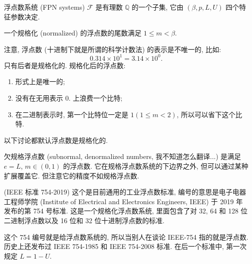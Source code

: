 \documentclass[a4paper]{ctexart}
\begin{document}
 浮点数系统 (FPN systems) $\mathscr{F}$ 是有理数
$\mathbb{Q}$ 的一个子集, 它由 $(\beta, p, L, U)$ 四个特征参数决定.

 一个规格化 (normalized) 的浮点数的尾数满足
$1 \leq m < \beta$.

注意, 浮点数 (十进制下就是所谓的科学计数法) 的表示是不唯一的, 比如:
$$
0.314 \times 10^1 = 3.14 \times 10^0.
$$
只有后者是规格化的. 规格化后的浮点数:
\begin{enumerate}
\item 形式上是唯一的;
\item 没有在无用表示 $0.$ 上浪费一个比特;
\item 在二进制表示时, 第一个比特位一定是 $1(1 \leq m < 2)$,
  所以可以省下这个比特.
\end{enumerate}
以下讨论都默认浮点数是规格化的.

 欠规格浮点数 (subnormal, denormalized numbers,
我不知道怎么翻译...) 是满足 $e = L$, $m \in (0, 1)$ 的浮点数.
它在规格浮点数系统的下边界之外, 但可以通过某种扩展覆盖它.
但注意它的精度不如规格浮点数.

 (IEEE 标准 754-2019) 这个是目前通用的工业浮点数标准,
编号的意思是电子电器工程师学院
(Institute of Electrical and Electronics Engineers, IEEE) 于 2019 年发布的第
754 号标准. 这是一个规格化浮点数系统, 里面包含了对 32, 64 和 128 位二进制浮点数以及
16 位和 32 位十进制浮点数的标准.

这个 754 编号就是给浮点数系统的, 所以当别人在谈论 IEEE-754 指的就是浮点数.
历史上还发布过 IEEE 754-1985 和 IEEE 754-2008 标准.
在后一个标准中, 第一次规定 $L = 1 - U$.
\end{document}
